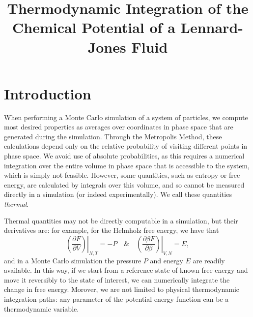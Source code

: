 \documentclass[]{article}
\title{Thermodynamic Integration of the Chemical Potential of a 
       Lennard-Jones Fluid}
\author{}
\begin{document}
\maketitle

\begin{abstract}

\end{abstract}

\section*{Introduction}

When performing a Monte Carlo simulation of a system of particles, we compute most desired properties as averages over coordinates in phase space that are generated during the simulation.
Through the Metropolis Method, these calculations depend only on the relative probability of visiting different points in phase space.
We avoid use of absolute probabilities, as this requires a numerical integration over the entire volume in phase space that is accessible to the system, which is simply not feasible.
However, some quantities, such as entropy or free energy, are calculated by integrals over this volume, and so cannot be measured directly in a simulation (or indeed experimentally).
We call these quantities \textit{thermal}.

Thermal quantities may not be directly computable in a simulation, but their derivatives are: for example, for the Helmholz free energy, we have that
\[
	\left.\left(\frac{\partial F}{\partial V}\right)\right\rvert_{N,T} = -P \quad \& \quad \left.\left(\frac{\partial \beta F}{\partial \beta}\right)\right\rvert_{V,N} = E,
\]
and in a Monte Carlo simulation the pressure $P$ and energy $E$ are readily available. 
In this way, if we start from a reference state of known free energy and move it reversibly to the state of interest, we can numerically integrate the change in free energy.
Morover, we are not limited to physical thermodynamic integration paths: any parameter of the potential energy function can be a thermodynamic variable. 
\end{document}
